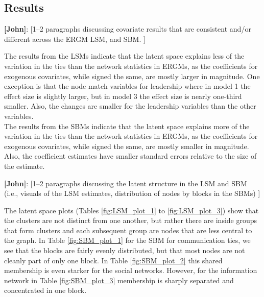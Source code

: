 \documentclass[fleqn,12pt]{wlscirep}
\begin{document}
\subsection{Results}

 {\bf [John]}: [1--2 paragraphs discussing covariate results that are consistent and/or different across the ERGM LSM, and SBM. ]

The results from the LSMs indicate that the latent space explains less of the variation in the ties than the network statistics in ERGMs, as the coefficients for exogenous covariates, while signed the same, are mostly larger in magnitude. One exception is that the node match variables for leadership where in model 1 the effect size is slightly larger, but in model 3 the effect size is nearly one-third smaller. Also, the changes are smaller for the leadership variables than the other variables.\\

The results from the SBMs indicate that the latent space explains more of the variation in the ties than the network statistics in ERGMs, as the coefficients for exogenous covariates, while signed the same, are mostly smaller in magnitude. Also, the coefficient estimates have smaller standard errors relative to the size of the estimate.


 {\bf [John]}: [1--2 paragraphs discussing the latent structure in the LSM and SBM (i.e., visuals of the LSM estimates, distribution of nodes by blocks in the SBMs) ]

The latent space plots (Tables \ref{fig:LSM_plot_1} to  \ref{fig:LSM_plot_3}) show that the clusters are not distinct from one another, but rather there are inside groups that form clusters and each subsequent group are nodes that are less central to the graph. In Table \ref{fig:SBM_plot_1} for the SBM for communication ties, we see that the blocks are fairly evenly distributed, but that most nodes are not cleanly part of only one block. In Table \ref{fig:SBM_plot_2} this shared membership is even starker for the social networks. However, for the information network in Table  \ref{fig:SBM_plot_3} membership is sharply separated and concentrated in one block.
\end{document}
